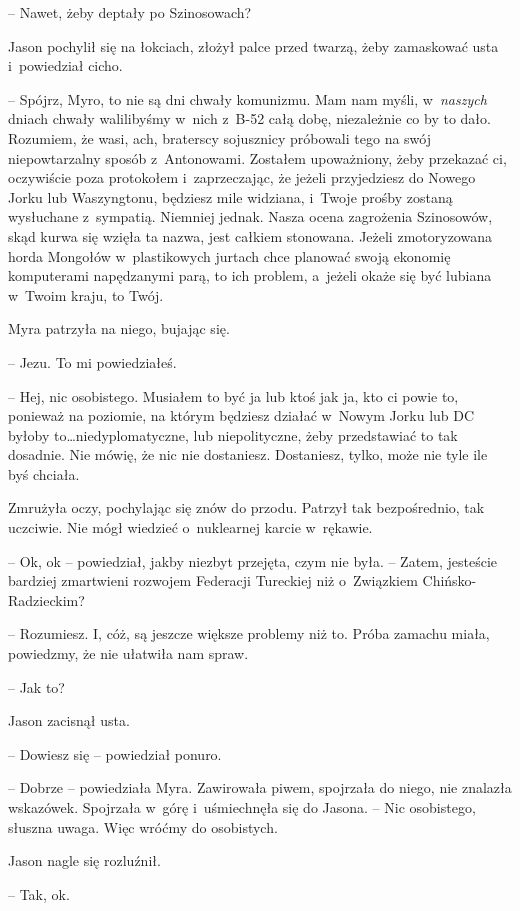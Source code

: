 \documentclass[oneside,polish,11pt,sfheadings]{mwbk}
\begin{document}
-- Nawet, żeby deptały po Szinosowach?

Jason pochylił się na łokciach, złożył palce przed twarzą, żeby
zamaskować usta i~powiedział cicho.

-- Spójrz, Myro, to nie są dni chwały komunizmu. Mam nam myśli, w~\textit{naszych} dniach chwały walilibyśmy w~nich z~B-52 całą dobę,
niezależnie co by to dało. Rozumiem, że wasi, ach, braterscy sojusznicy
próbowali tego na swój niepowtarzalny sposób z~Antonowami. Zostałem
upoważniony, żeby przekazać ci, oczywiście poza protokołem i~zaprzeczając, że jeżeli przyjedziesz do Nowego Jorku lub Waszyngtonu,
będziesz mile widziana, i~Twoje prośby zostaną wysłuchane z~sympatią.
Niemniej jednak. Nasza ocena zagrożenia Szinosowów, skąd kurwa się
wzięła ta nazwa, jest całkiem stonowana. Jeżeli zmotoryzowana horda
Mongołów w~plastikowych jurtach chce planować swoją ekonomię komputerami
napędzanymi parą, to ich problem, a~jeżeli okaże się być lubiana w~Twoim
kraju, to Twój.

Myra patrzyła na niego, bujając się. 

-- Jezu. To mi powiedziałeś.

-- Hej, nic osobistego. Musiałem to być ja lub ktoś jak ja, kto ci powie
to, ponieważ na poziomie, na którym będziesz działać w~Nowym Jorku lub
DC byłoby to\ldots niedyplomatyczne, lub niepolityczne, żeby przedstawiać
to tak dosadnie. Nie mówię, że nic nie dostaniesz. Dostaniesz, tylko,
może nie tyle ile byś chciała.

Zmrużyła oczy, pochylając się znów do przodu. Patrzył tak bezpośrednio,
tak uczciwie. Nie mógł wiedzieć o~nuklearnej karcie w~rękawie.

-- Ok, ok -- powiedział, jakby niezbyt przejęta, czym nie była. -- Zatem,
jesteście bardziej zmartwieni rozwojem Federacji Tureckiej niż o~Związkiem Chińsko-Radzieckim?

-- Rozumiesz. I, cóż, są jeszcze większe problemy niż to. Próba zamachu
miała, powiedzmy, że nie ułatwiła nam spraw.

-- Jak to?

Jason zacisnął usta. 

-- Dowiesz się -- powiedział ponuro.

-- Dobrze -- powiedziała Myra. Zawirowała piwem, spojrzała do niego, nie
znalazła wskazówek. Spojrzała w~górę i~uśmiechnęła się do Jasona. -- Nic
osobistego, słuszna uwaga. Więc wróćmy do osobistych.

Jason nagle się rozluźnił. 

-- Tak, ok.
\end{document}
